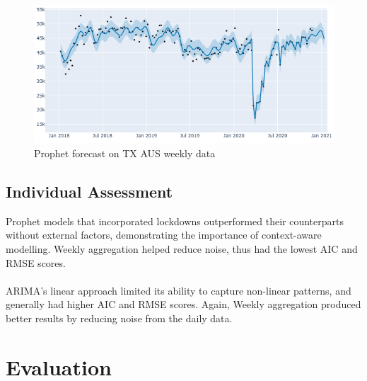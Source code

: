 \documentclass{article}
\begin{document}
        \begin{figure}[H]
            \centering
            \includegraphics[width=0.85\linewidth]{assets/Prophet-Weekly.png}
            \caption{Prophet forecast on TX AUS weekly data}
            \label{fig:Prophet-Weekly}
        \end{figure}
    \subsection{Individual Assessment}
        Prophet models that incorporated lockdowns outperformed their counterparts without external 
        factors, demonstrating the importance of context-aware modelling. Weekly aggregation helped 
        reduce noise, thus had the lowest AIC and RMSE scores. \\
        \\
        ARIMA’s linear approach limited its ability to capture non-linear patterns, and generally 
        had higher AIC and RMSE scores. Again, Weekly aggregation produced better results by reducing
        noise from the daily data.


\section{Evaluation}
\end{document}
